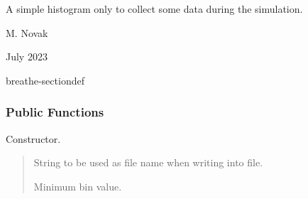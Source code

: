 \documentclass[letterpaper,10pt,english]{sphinxmanual}
\begin{document}
\begin{fulllineitems}
\label{\detokenize{Simulation/SimulationCodeDoc:_CPPv44Hist}}
\pysigstartsignatures
\pysigstartmultiline
{}
\pysigstopmultiline
\pysigstopsignatures
\sphinxAtStartPar
A simple histogram only to collect some data during the simulation. 

\sphinxAtStartPar
\begin{description}
\sphinxAtStartPar
M. Novak 

\sphinxAtStartPar
July 2023 

\end{description}


\begin{sphinxuseclass}{breathe-sectiondef}\subsubsection*{Public Functions}

\begin{fulllineitems}
\label{\detokenize{Simulation/SimulationCodeDoc:_CPPv4N4Hist4HistERKNSt6stringEddi}}
\pysigstartsignatures
\pysigstartmultiline
{}
\pysigstopmultiline
\pysigstopsignatures
\sphinxAtStartPar
Constructor. 

\sphinxAtStartPar
\begin{quote}\begin{description}
\sphinxAtStartPar
String to be used as file name when writing into file. 

\sphinxAtStartPar
Minimum bin value. 


\end{description}
\end{quote}
\end{fulllineitems}
\end{sphinxuseclass}
\end{fulllineitems}
\end{document}
